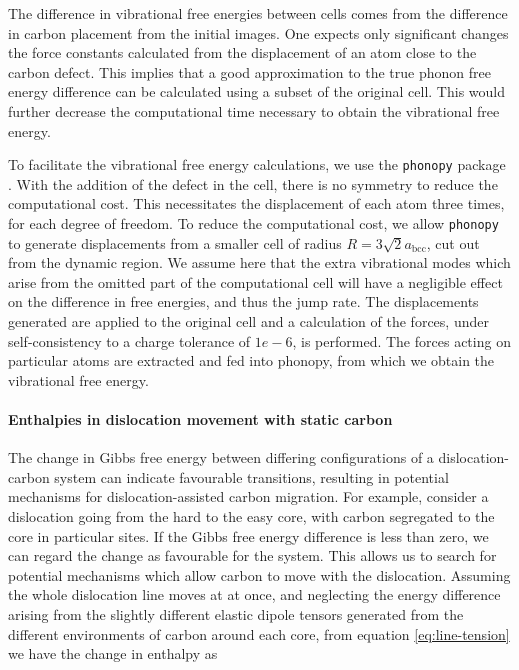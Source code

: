 \documentclass[a4paper,11pt]{article}
\numberwithin{equation}{chapter}
\numberwithin{listing}{chapter}
\begin{document}
The difference in vibrational free energies between cells comes from the difference in carbon
placement from the initial images. One expects only significant changes the force constants calculated from the
displacement of an atom close to the carbon defect. This implies that a good
approximation to the true phonon free energy difference can be calculated using a subset of the
original cell. This would further decrease the computational time necessary to obtain the
vibrational free energy.

To facilitate the vibrational free energy calculations, we use the \texttt{phonopy} package
\cite{phonopy}. With the addition of the defect in the cell, there is no symmetry to reduce the
computational cost. This necessitates the displacement of each atom three
times, for each degree of freedom. To reduce
the computational cost, we allow \texttt{phonopy} to generate displacements from a smaller cell of
radius \(R = 3\sqrt{2}a_\text{bcc}\), cut out from the dynamic region. We assume here that the
extra vibrational modes which arise from the omitted part of the computational cell will have a
negligible effect on the difference in free energies, and thus the jump rate. The displacements
generated are applied to the original cell and a calculation of the forces, under
self-consistency to a charge tolerance of \(1e-6\), is performed. The forces acting on particular
atoms are extracted and fed into phonopy, from which we obtain the vibrational free energy.


\paragraph{Enthalpies in dislocation movement with static carbon}
\label{sec:org77a27e0}

The change in Gibbs free energy between differing configurations
of a dislocation-carbon system can indicate favourable
transitions, resulting in potential mechanisms for dislocation-assisted carbon
migration. For example, consider a dislocation going from the hard
to the easy core, with carbon segregated to the core in particular
sites. If the Gibbs free energy difference is less than zero, we
can regard the change as favourable for the system. This allows us
to search for potential mechanisms which allow carbon to move with
the dislocation. Assuming the whole dislocation line moves at at
once, and neglecting the energy difference arising from the
slightly different elastic dipole tensors generated from the
different environments of carbon around each core, from equation
\ref{eq:line-tension} we have the change in enthalpy as
\end{document}
